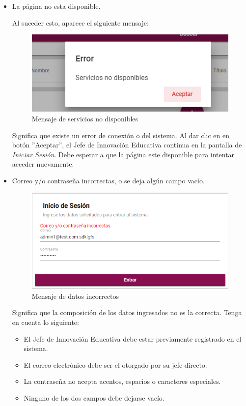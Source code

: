             \begin{itemize}
                \item La página no esta disponible.

                    Al suceder esto, aparece el siguiente mensaje:
                    \begin{figure}[H]
                        \centering
                        \hypertarget{MSG25}{\includegraphics[width=0.4\linewidth]{images/SP5/MSGSN}}
                        \caption{Mensaje de servicios no disponibles}
                    \end{figure}

                    Significa que existe un error de conexión o del sistema. Al dar clic en en botón ''Aceptar'', el Jefe de Innovación Educativa continua en la pantalla de \hyperlink{iniciarL}{\textit{Iniciar Sesión}}. Debe esperar a que la página este disponible para intentar acceder nuevamente.

                \item Correo y/o contraseña incorrectas, o se deja algún campo vacío.
                    \begin{figure}[H]
                        \centering
                        \hypertarget{MSG0}{\includegraphics[width=0.4\linewidth]{images/SP5/LoginIncorrecto}}
                        \caption{Mensaje de datos incorrectos}
                    \end{figure}

                Significa que la composición de los datos ingresados no es la correcta. Tenga en cuenta lo siguiente:

                            \begin{itemize}
                                \item El Jefe de Innovación Educativa debe estar previamente registrado en el sistema.
                                \item El correo electrónico debe ser el otorgado por su jefe directo.
                                \item La contraseña no acepta acentos, espacios o caracteres especiales.
                                \item Ninguno de los dos campos debe dejarse vacío.
                            \end{itemize}

            \end{itemize}
